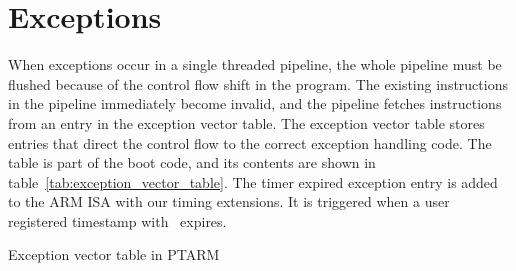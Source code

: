 \section{Exceptions}
\label{subsec:exception_handling_in_ptarm}
When exceptions occur in a single threaded pipeline, the whole pipeline must be flushed because of the control flow shift in the program. 
The existing instructions in the pipeline immediately become invalid, and the pipeline fetches instructions from an entry in the exception vector table. 
The exception vector table stores entries that direct the control flow to the correct exception handling code.  
The table is part of the boot code, and its contents are shown in table~\ref{tab:exception_vector_table}.
The timer expired exception entry is added to the ARM ISA with our timing extensions.
It is triggered when a user registered timestamp with \exceptiononexpire\ expires.  
\begin{table}[h]
\noindent{}
\vspace{1mm}
\caption{Exception vector table in PTARM}
\label{tab:exception_vector_table}
\end{table}

